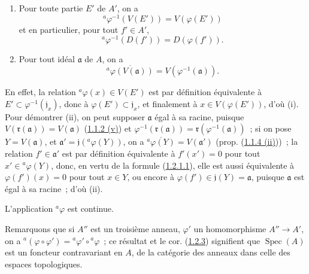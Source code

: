 \begin{proposition}[1.2.2]
\label{I.1.2.2-fr}
\begin{enumerate}
  \item[\rm(i)] Pour toute partie $E'$ de $A'$, on a
  \begin{equation}
    {}^a\varphi^{-1}(V(E'))=V(\varphi(E'))
    \tag{1.2.2.1}\label{I.1.2.2.1-fr}
  \end{equation}
  et en particulier, pour tout $f'\in A'$,
  \begin{equation}
    {}^a\varphi^{-1}(D(f'))=D(\varphi(f')).
    \tag{1.2.2.2}\label{I.1.2.2.2-fr}
  \end{equation}
  \item[\rm(ii)] Pour tout idéal $\mathfrak{a}$ de $A$, on a
  \begin{equation}
    \overline{{}^a\varphi(V(\mathfrak{a}))}
    =V(\varphi^{-1}(\mathfrak{a})).
    \tag{1.2.2.3}\label{I.1.2.2.3-fr}
  \end{equation}
\end{enumerate}
\end{proposition}

En effet, la relation ${}^a\varphi(x)\in V(E')$ est par définition
équivalente à $E'\subset\varphi^{-1}(\mathfrak{j}_x)$, donc à
$\varphi(E')\subset\mathfrak{j}_x$, et finalement à
$x\in V(\varphi(E'))$, d'où (i). Pour démontrer (ii), on peut supposer
$\mathfrak{a}$ égal à sa racine, puisque
$V(\mathfrak{r}(\mathfrak{a}))=V(\mathfrak{a})$
(\hyperref[I.1.1.2-fr]{1.1.2 (v)}) et
$\varphi^{-1}(\mathfrak{r}(\mathfrak{a}))
=\mathfrak{r}(\varphi^{-1}(\mathfrak{a}))$~; si on pose
$Y=V(\mathfrak{a})$, et
$\mathfrak{a}'=\mathfrak{j}({}^a\varphi(Y))$, on a
$\overline{{}^a\varphi(Y)}=V(\mathfrak{a}')$ (prop.
(\hyperref[I.1.1.4-fr]{1.1.4 (ii)}))~; la relation
$f'\in\mathfrak{a}'$ est par définition équivalente à $f'(x')=0$ pour tout
$x'\in{}^a\varphi(Y)$, donc, en vertu de la formule
(\hyperref[I.1.2.1.1-fr]{1.2.1.1}), elle est aussi équivalente à
$\varphi(f')(x)=0$ pour tout $x\in Y$, ou encore à
$\varphi(f')\in\mathfrak{j}(Y)=\mathfrak{a}$, puisque $\mathfrak{a}$ est
égal à sa racine~; d'où (ii).

\begin{corollary}[1.2.3]
\label{I.1.2.3-fr}
L'application ${}^a\varphi$ est continue.
\end{corollary}

Remarquons que si $A''$ est un troisième anneau, $\varphi'$ un homomorphisme
$A''\to A'$, on a
${}^a(\varphi\circ\varphi')={}^a\varphi'\circ{}^a\varphi$~; ce résultat et le
cor. (\hyperref[I.1.2.3-fr]{1.2.3}) signifient que
$\operatorname{Spec}(A)$ est un foncteur contravariant en $A$, de la
catégorie des anneaux dans celle des espaces topologiques.

